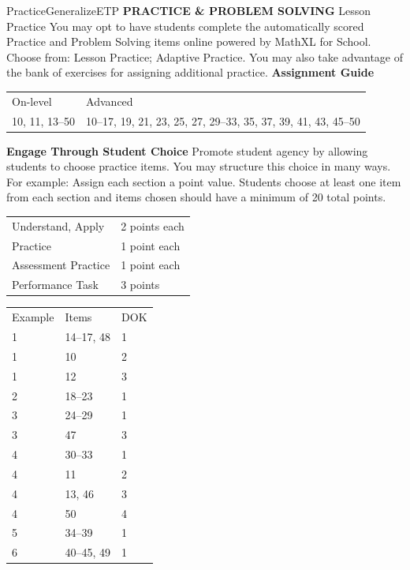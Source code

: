 \documentclass{article}
\newenvironment{item-analysis}{}{}      %
\newenvironment{te-addendum}[2]{}{}     %
\newcommand{\te}[1]{}                   %
\begin{document}
\begin{te-addendum}{Practice}{GeneralizeETP}
\textbf{PRACTICE \& PROBLEM SOLVING}
Lesson Practice You may opt to have students complete the automatically scored Practice and Problem Solving items online powered by MathXL for School.
Choose from: Lesson Practice; Adaptive Practice.
You may also take advantage of the bank of exercises for assigning additional practice.
\textbf{Assignment Guide}
\begin{tabular}{ll}
On-level & Advanced \\
10, 11, 13--50 & 10--17, 19, 21, 23, 25, 27, 29--33, 35, 37, 39, 41, 43, 45--50 \\
\end{tabular}
\textbf{Engage Through Student Choice}
Promote student agency by allowing students to choose practice items. You may structure this choice in many ways.
For example:
Assign each section a point value. Students choose at least one item from each section and items chosen should have a minimum of 20 total points.
\begin{tabular}{ll}
Understand, Apply & 2 points each \\
Practice & 1 point each \\
Assessment Practice & 1 point each \\
Performance Task & 3 points \\
\end{tabular}
\te{SavvasRealize.com. Practice. Practice \& Problem Solving and video tutorials are available at SavvasRealize.com. Scan the QR code to access a video tutorial. See answers for 11--13 on next page.}
\end{te-addendum}
\begin{item-analysis}
\begin{tabular}{lll}
Example & Items & DOK \\
1 & 14--17, 48 & 1 \\
1 & 10 & 2 \\
1 & 12 & 3 \\
2 & 18--23 & 1 \\
3 & 24--29 & 1 \\
3 & 47 & 3 \\
4 & 30--33 & 1 \\
4 & 11 & 2 \\
4 & 13, 46 & 3 \\
4 & 50 & 4 \\
5 & 34--39 & 1 \\
6 & 40--45, 49 & 1 \\
\end{tabular}
\end{item-analysis}
\end{document}
